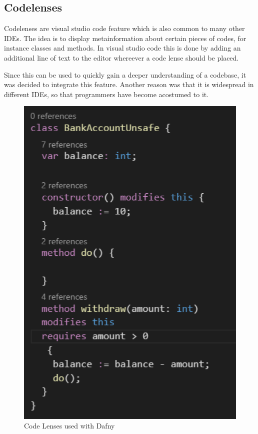 \subsection{Codelenses} \label{codelenses}
Codelenses are visual studio code feature which is also common to many other IDEs. The idea is to display metainformation about certain pieces of codes, for instance classes and methods. In visual studio code this is done  by adding an additional line of text to the editor whereever a code lense should  be placed. \newline

Since this can be used to quickly gain a deeper understanding of a codebase, it was decided to integrate this feature. Another reason was that it is widespread in different IDEs, so that programmers have become acostumed to it. \newline

\begin{figure}[H]
	\centering
	\includegraphics[width=1\textwidth]{img/codelensesClosed}
	\caption{Code Lenses used with Dafny}
	\label{fig:codelensesclosed}
\end{figure}

